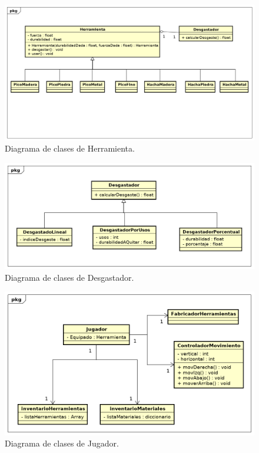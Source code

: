 \documentclass[titlepage,a4paper]{article}
\begin{document}
\begin{figure}[H]
\centering
\includegraphics[width=\textwidth]{Diagramas/Herramienta.png}
\caption{\label{fig:herramienta}Diagrama de clases de Herramienta.}
\end{figure}

\begin{figure}[H]
\centering
\includegraphics[width=\textwidth]{Diagramas/Desgastador.png}
\caption{\label{fig:desgastador}Diagrama de clases de Desgastador.}
\end{figure}

\begin{figure}[H]
\centering
\includegraphics[width=\textwidth]{Diagramas/Jugador.png}
\caption{\label{fig:jugador}Diagrama de clases de Jugador.}
\end{figure}
\end{document}
